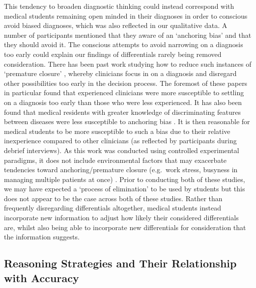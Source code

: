 \documentclass[a4paper, nobind]{templates/ociamthesis}
\begin{document}
This tendency to broaden diagnostic thinking could instead correspond with medical students remaining open minded in their diagnoses in order to conscious avoid biased diagnoses, which was also reflected in our qualitative data. A number of participants mentioned that they aware of an `anchoring bias' and that they should avoid it. The conscious attempts to avoid narrowing on a diagnosis too early could explain our findings of differentials rarely being removed consideration. There has been past work studying how to reduce such instances of `premature closure' \autocite{voytovich_premature_1985,eva_difficulty_2006,krupat_avoiding_2017}, whereby clinicians focus in on a diagnosis and disregard other possibilities too early in the decision process. The foremost of these papers in particular found that experienced clinicians were more susceptible to settling on a diagnosis too early than those who were less experienced. It has also been found that medical residents with greater knowledge of discriminating features between diseases were less susceptible to anchoring bias \autocite{mamede_role_2024}. It is then reasonable for medical students to be more susceptible to such a bias due to their relative inexperience compared to other clinicians (as reflected by participants during debrief interviews). As this work was conducted using controlled experimental paradigms, it does not include environmental factors that may exacerbate tendencies toward anchoring/premature closure (e.g.~work stress, busyness in managing multiple patients at once) \autocite{gupta_associations_2023}. Prior to conducting both of these studies, we may have expected a `process of elimination' to be used by students but this does not appear to be the case across both of these studies. Rather than frequently disregarding differentials altogether, medical students instead incorporate new information to adjust how likely their considered differentials are, whilst also being able to incorporate new differentials for consideration that the information suggests.

\subsection{Reasoning Strategies and Their Relationship with Accuracy}\label{reasoning-strategies-and-their-relationship-with-accuracy}
\end{document}
